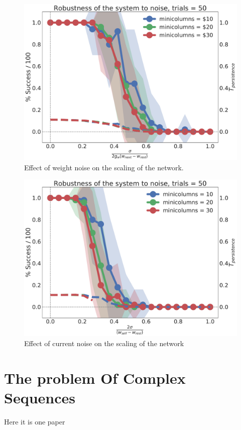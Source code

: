 \documentclass[10pt,a4paper]{article}
\begin{document}
\begin{figure}[H]
\centering
\includegraphics[scale=0.30]{minicolumns_recall_noise.pdf}
\caption{Effect of weight noise on the scaling of the network.}
\label{fig:current_noise_scale}
\end{figure}

\begin{figure}[H]
\centering
\includegraphics[scale=0.30]{matrix_noise_minicolumns.pdf}
\caption{Effect of current noise on the scaling of the network}
\label{fig:matrix_noise_scale}
\end{figure}




\section{The problem Of Complex Sequences}
Here it is one paper \cite{guyon1988storage}



\end{document}
